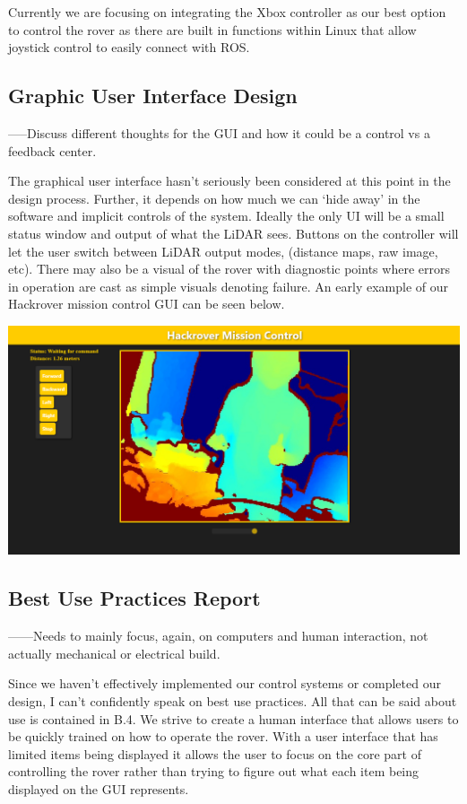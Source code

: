 \documentclass[a4paper, 10pt]{article}
\begin{document}
Currently we are focusing on integrating the Xbox controller as our best option to control the rover as there are built in functions within Linux that allow joystick control to easily connect with ROS. 


	\subsection{Graphic User Interface Design}
	-----Discuss different thoughts for the GUI and how it could be a control vs a feedback center.
	
	The graphical user interface hasn’t seriously been considered at this point in the design process. Further, it depends on how much we can ‘hide away’ in the software and implicit controls of the system. Ideally the only UI will be a small status window and output of what the LiDAR sees. Buttons on the controller will let the user switch between LiDAR output modes, (distance maps, raw image, etc). There may also be a visual of the rover with diagnostic points where errors in operation are cast as simple visuals denoting failure. An early example of our Hackrover mission control GUI can be seen below.
	
\includegraphics[scale=0.8]{hackrover mission control}

	\subsection{Best Use Practices Report}
	------Needs to mainly focus, again, on computers and human interaction, not actually mechanical or electrical build. 
	
	Since we haven't effectively implemented our control systems or completed our design, I can't confidently speak on best use practices. All that can be said about use is contained in B.4. We strive to create a human interface that allows users to be quickly trained on how to operate the rover. With a user interface that has limited items being displayed it allows the user to focus on the core part of controlling the rover rather than trying to figure out what each item being displayed on the GUI represents. 
	
\end{document}
